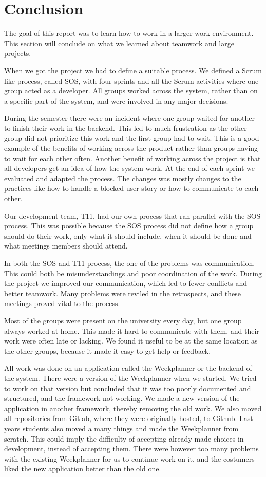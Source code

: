 \section{Conclusion}
The goal of this report was to learn how to work in a larger work environment. This section will conclude on what we learned about teamwork and large projects. 

When we got the project we had to define a suitable process. We defined a Scrum like process, called \gls{SOS}, with four sprints and all the Scrum activities where one group acted as a developer. All groups worked across the system, rather than on a specific part of the system, and were involved in any major decisions. 

During the semester there were an incident where one group waited for another to finish their work in the backend. This led to much frustration as the other group did not prioritize this work and the first group had to wait. This is a good example of the benefits of working across the product rather than groups having to wait for each other often. Another benefit of working across the project is that all developers get an idea of how the system work.
At the end of each sprint we evaluated and adapted the process. The changes was mostly changes to the practices like how to handle a blocked user story or how to communicate to each other.

Our development team, \gls{T11}, had our own process that ran parallel with the \gls{SOS} process. This was possible because the \gls{SOS} process did not define how a group should do their work, only what it should include, when it should be done and what meetings members should attend. 

In both the \gls{SOS} and \gls{T11} process, the one of the problems was communication. This could both be misunderstandings and poor coordination of the work. During the project we improved our communication, which led to fewer conflicts and better teamwork. Many problems were reviled in the retrospects, and these meetings proved vital to the process. 

Most of the groups were present on the university every day, but one group always worked at home. This made it hard to communicate with them, and their work were often late or lacking. We found it useful to be at the same location as the other groups, because it made it easy to get help or feedback.

All work was done on an application called the Weekplanner or the backend of the system. There were a version of the Weekplanner when we started. We tried to work on that version but concluded that it was too poorly documented and structured, and the framework not working. We made a new version of the application in another framework, thereby removing the old work. We also moved all repositories from Gitlab, where they were originally hosted, to Github. Last years students also moved a many things and made the Weekplanner from scratch. This could imply the difficulty of accepting already made choices in development, instead of accepting them. There were however too many problems with the existing Weekplanner for us to continue work on it, and the costumers liked the new application better than the old one.

